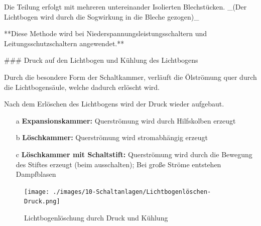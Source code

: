 \begin{markdown}
Die Teilung erfolgt mit mehreren untereinander Isolierten Blechstücken. _(Der Lichtbogen wird durch die Sogwirkung in die Bleche gezogen)_

**Diese Methode wird bei Niederspannungsleistungsschaltern und Leitungsschutzschaltern angewendet.**

\vspace{3em}

### Druck auf den Lichtbogen und Kühlung des Lichtbogens


Durch die besondere Form der Schaltkammer, verläuft die Ölströmung quer durch die Lichtbogensäule, welche dadurch erlöscht wird.

Nach dem Erlöschen des Lichtbogens wird der Druck wieder aufgebaut.

\end{markdown}

\begin{enumerate}
    \item[a] \textbf{Expansionskammer:} Querströmung wird durch Hilfskolben erzeugt
    \item[b] \textbf{Löschkammer:} Querströmung wird stromabhängig erzeugt 
    \item[c] \textbf{Löschkammer mit Schaltstift:} Querströmung wird durch die Bewegung des Stiftes erzeugt (beim ausschalten); Bei große Ströme entstehen Dampfblasen   
\end{enumerate}

\begin{figure}[H]
    \centering
    \texttt{[image: ./images/10-Schaltanlagen/Lichtbogenlöschen-Druck.png]}
    \caption[Lichtbogenlöschung durch Druck und Kühlung]{Lichtbogenlöschung durch Druck und Kühlung}
\end{figure}

\newpage

